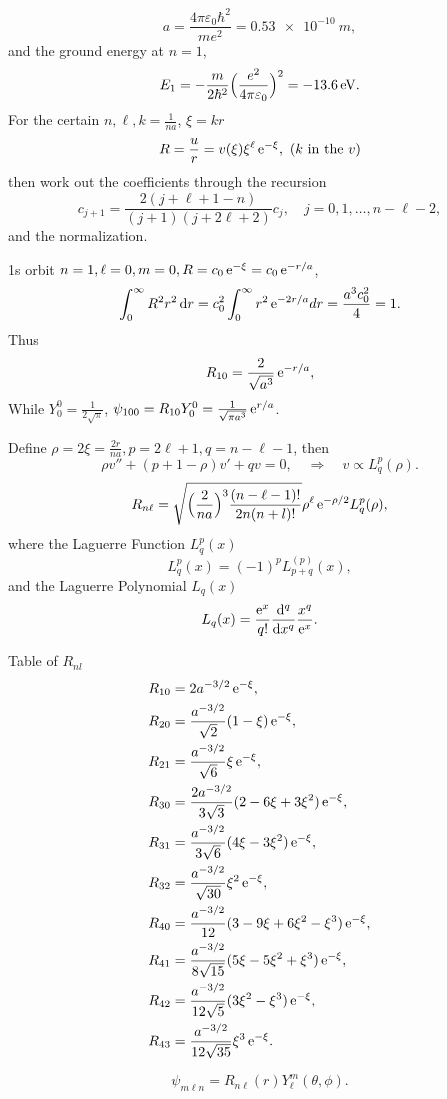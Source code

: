 \documentclass{article}
\newcommand{\su}[1]{\vspace{-#1 pt}}
\begin{document}
$$a=\frac{4\pi\varepsilon_0\hbar^2}{me^2}=\qty{0.53e-10}{m},$$
and the ground energy at $n=1$,
$$E_1=-\frac m{2\hbar^2}\Bigl(\frac{e^2}{4\pi\varepsilon_0}\Bigr)^2=\qty{-13.6}{eV}.$$
For the certain $n,\ell,k=\frac1{na}$, $\xi=kr$
$$R=\frac ur=v(\xi)\xi^\ell \e^{-\xi},~(k{\rm~in~the}~v)$$
then work out the coefficients through the recursion
$$c_{j+1}=\frac{2(j+\ell+1-n)}{(j+1)(j+2\ell+2)}c_j,\quad j=0,1,\ldots,n-\ell-2,$$
and the normalization.
\begin{example}{1s orbit}{}
	$n=1,\ell=0,m=0,R=c_0\e^{-\xi}=c_0\e^{-r/a}$,
	$$\intRplus R^2r^2\d r=c_0^2\intRplus r^2\e^{-2r/a}d r=\frac{a^3c_0^2}4=1.$$
	Thus
	$$R_{10}=\frac2{\sqrt{a^3}}\e^{-r/a},$$
	While $Y_0^0=\frac1{2\sqrt\pi}$, $\psi_{100}=R_{10}Y_0^0=\frac1{\sqrt{\pi a^3}}\e^{r/a}$.
\end{example}
Define $\rho=2\xi=\frac{2r}{na},p=2\ell+1,q=n-\ell-1$, then
$$\rho v''+(p+1-\rho)v'+qv=0,\quad\Rightarrow\quad v\propto L_q^p(\rho).$$
$$R_{n\ell}=\sqrt{\Bigp{\frac2{na}}^3\frac{(n-\ell-1)!}{2n(n+l)!}}\rho^\ell \e^{-\rho/2}L_q^p(\rho),$$
where the Laguerre Function $L_q^p(x)$
$$L_q^p(x)=(-1)^pL_{p+q}^{(p)}(x),$$
and the Laguerre Polynomial $L_q(x)$
$$L_q(x)=\frac{\e^x}{q!}\dd[q]{x}\frac{x^q}{\e^x}.$$
\begin{example}{Table of $R_{nl}$}{}\su{12}
	\begin{align*}
		R_{10} & =2a^{-3/2}\e^{-\xi},                                      \\
		R_{20} & =\frac{a^{-3/2}}{\sqrt2}(1-\xi)\e^{-\xi},                 \\
		R_{21} & =\frac{a^{-3/2}}{\sqrt6}\xi \e^{-\xi},                    \\
		R_{30} & =\frac{2a^{-3/2}}{3\sqrt3}(2-6\xi+3\xi^2)\e^{-\xi},       \\
		R_{31} & =\frac{a^{-3/2}}{3\sqrt6}(4\xi-3\xi^2)\e^{-\xi},          \\
		R_{32} & =\frac{a^{-3/2}}{\sqrt{30}}\xi^2\e^{-\xi},                \\
		R_{40} & =\frac{a^{-3/2}}{12}(3-9\xi+6\xi^2-\xi^3)\e^{-\xi},       \\
		R_{41} & =\frac{a^{-3/2}}{8\sqrt{15}}(5\xi-5\xi^2+\xi^3)\e^{-\xi}, \\
		R_{42} & =\frac{a^{-3/2}}{12\sqrt5}(3\xi^2-\xi^3)\e^{-\xi},        \\
		R_{43} & =\frac{a^{-3/2}}{12\sqrt{35}}\xi^3\e^{-\xi}.
	\end{align*}
\end{example}
$$\psi_{m\ell n}=R_{n\ell}(r)Y_\ell^m(\theta,\phi).$$
\end{document}
